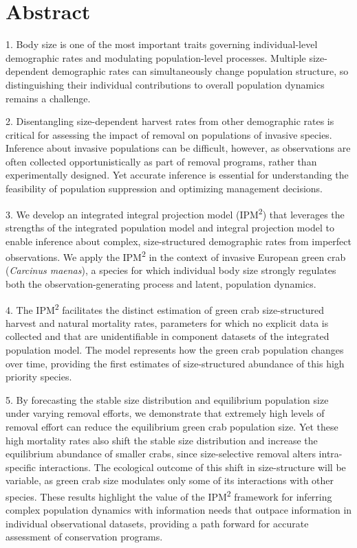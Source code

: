 \documentclass{article}
\begin{document}
\doublespacing

\linenumbers

\section{Abstract}

1.	Body size is one of the most important traits governing individual-level demographic rates and modulating population-level processes. Multiple size-dependent demographic rates can simultaneously change population structure, so distinguishing their individual contributions to overall population dynamics remains a challenge.

2.	Disentangling size-dependent harvest rates from other demographic rates is critical for assessing the impact of removal on populations of invasive species. Inference about invasive populations can be difficult, however, as observations are often collected opportunistically as part of removal programs, rather than experimentally designed. Yet accurate inference is essential for understanding the feasibility of population suppression and optimizing management decisions.

3.	We develop an integrated integral projection model (IPM\textsuperscript{2}) that leverages the strengths of the integrated population model and integral projection model to enable inference about complex, size-structured demographic rates from imperfect observations. We apply the IPM\textsuperscript{2} in the context of invasive European green crab (\textit{Carcinus maenas}), a species for which individual body size strongly regulates both the observation-generating process and latent, population dynamics.

4.	The IPM\textsuperscript{2} facilitates the distinct estimation of green crab size-structured harvest and natural mortality rates, parameters for which no explicit data is collected and that are unidentifiable in component datasets of the integrated population model. The model represents how the green crab population changes over time, providing the first estimates of size-structured abundance of this high priority species. 

5.	By forecasting the stable size distribution and equilibrium population size under varying removal efforts, we demonstrate that extremely high levels of removal effort can reduce the equilibrium green crab population size. Yet these high mortality rates also shift the stable size distribution and increase the equilibrium abundance of smaller crabs, since size-selective removal alters intra-specific interactions. The ecological outcome of this shift in size-structure will be variable, as green crab size modulates only some of its interactions with other species. These results highlight the value of the IPM\textsuperscript{2} framework for inferring complex population dynamics with information needs that outpace information in individual observational datasets, providing a path forward for accurate assessment of conservation programs.
\end{document}

